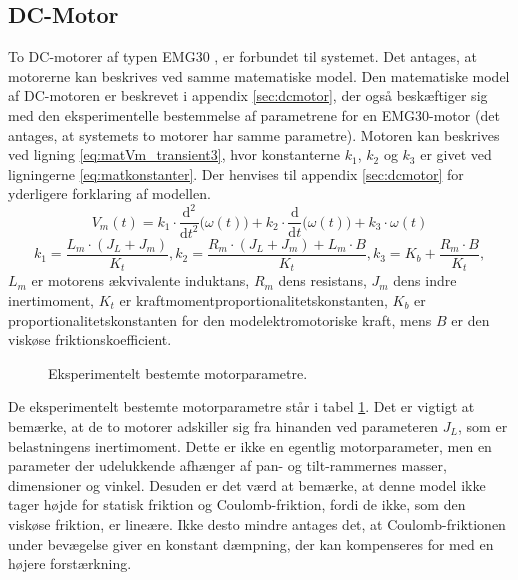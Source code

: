\subsection{DC-Motor}
To DC-motorer af typen EMG30 \citep{emgmotor}, er forbundet til systemet.
Det antages, at motorerne kan beskrives ved samme matematiske model.
Den matematiske model af DC-motoren er beskrevet i appendix \ref{sec:dcmotor},
der også beskæftiger sig med den eksperimentelle bestemmelse af parametrene for en EMG30-motor
(det antages, at systemets to motorer har samme parametre).
Motoren kan beskrives ved ligning \ref{eq:matVm_transient3}, hvor konstanterne \(k_1\), \(k_2\) og \(k_3\)
er givet ved ligningerne \ref{eq:matkonstanter}. Der henvises til appendix \ref{sec:dcmotor}
for yderligere forklaring af modellen.
\begin{equation}
	V_m\left(t\right)=k_1\cdot{}\frac{\mathrm d^2}{\mathrm d t^2} \big(\omega\left(t\right) \big)
		+k_2\cdot{}\frac{\mathrm d}{\mathrm d t} \big(\omega\left(t\right) \big)
		+k_3\cdot{}\omega\left(t\right)
	\label{eq:matVm_transient3}
 \end{equation}
\begin{equation}
	k_1=\frac{L_m\cdot{}\left(J_L+J_m\right)}{K_t},
	k_2=\frac{R_m\cdot{}\left(J_L+J_m\right)+L_m\cdot{}B}{K_t},
	k_3=K_b+\frac{R_m\cdot{}B}{K_t},
	\label{eq:matkonstanter} 
 \end{equation}
\(L_m\) er motorens ækvivalente induktans, \(R_m\) dens resistans, \(J_m\) dens indre inertimoment,
\(K_t\) er kraftmomentproportionalitetskonstanten, \(K_b\) er proportionalitetskonstanten for den modelektromotoriske kraft,
mens \(B\) er den viskøse friktionskoefficient.
\begin{figure}[th!]
	\centering
	
	\captionsetup{type=table}
	\caption[Motorparametre]
			{Eksperimentelt bestemte motorparametre.}
	\label{tb:matmotorparametre}
\end{figure}
De eksperimentelt bestemte motorparametre står i tabel \ref{tb:matmotorparametre}.
Det er vigtigt at bemærke, at de to motorer adskiller sig fra hinanden ved parameteren \(J_L\), som er belastningens
inertimoment. Dette er ikke en egentlig motorparameter, men en parameter der udelukkende afhænger
af pan- og tilt-rammernes masser, dimensioner og vinkel.
Desuden er det værd at bemærke, at denne model ikke tager højde for statisk friktion og Coulomb-friktion,
fordi de ikke, som den viskøse friktion, er lineære. Ikke desto mindre antages det, at Coulomb-friktionen under
bevægelse giver en konstant dæmpning, der kan kompenseres for med en højere forstærkning.

